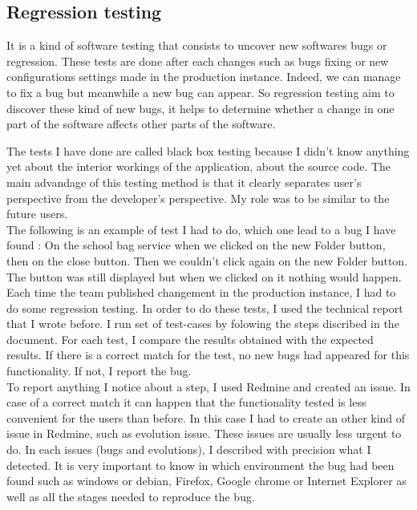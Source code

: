 \newpage
\subsection{Regression testing}
It is a kind of software testing that consists to uncover new softwares bugs
or regression. These tests are done after each changes such as bugs fixing or new
 configurations settings made in the production instance. 
 Indeed, we can manage to fix a bug but 
meanwhile a new bug can appear. So regression testing aim to discover these
kind of new bugs, it helps to determine whether a change in one part of the
 software affects other parts of the software. 
 
 The tests I have done are called black box testing because I didn't know anything yet about
 the interior workings of the application, about the source code. The main advandage of this 
 testing method is that it clearly separates user's perspective from the developer's
 perspective. My role was to be similar to the future users.\\



The following is an example of test I had to do, which one lead to a bug I have found : 
On the school bag service when we clicked on the new Folder button, then on the close button. 
Then we couldn't click again on the new Folder button. The button was still displayed but when we clicked on it nothing would happen. \\

Each time the team published changement in the production instance, I had to do some
regression testing. In order to do these tests, I used the technical report that I wrote
before. I run set of test-cases by folowing the steps discribed in the document. 
For each test, I compare the results obtained with the expected results. 
If there is a correct match for the test, no new bugs had appeared for this functionality.
 If not, I report the bug. \\
 
 To report anything I notice about a step, I used Redmine and created an issue.
 In case of a correct match it can happen that the functionality tested is less convenient
 for the users than before. In this case I had to create an other kind of issue in Redmine,
such as evolution issue. These issues are usually less urgent to do. 
In each issues (bugs and evolutions), I described with precision what I detected. 
It is very  important to know in which environment the bug had been found such as 
windows or debian, Firefox, Google chrome or Internet Explorer as well as 
all the stages needed to reproduce the bug.  \\ 

